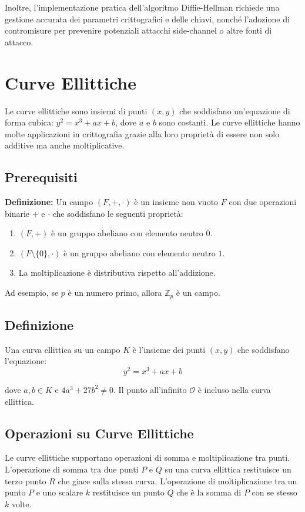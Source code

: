 \documentclass[a4paper,12pt]{report}
\begin{document}
Inoltre, l'implementazione pratica dell'algoritmo Diffie-Hellman richiede una gestione accurata dei parametri crittografici e delle chiavi, nonché l'adozione di contromisure per prevenire potenziali attacchi side-channel o altre fonti di attacco.
%
%
%
%
%
%
\chapter{Curve Ellittiche}
Le curve ellittiche sono insiemi di punti $(x, y)$ che soddisfano un'equazione di forma cubica: $y^2 = x^3 + ax + b$, dove $a$ e $b$ sono costanti. Le curve ellittiche hanno molte applicazioni in crittografia grazie alla loro proprietà di essere non solo additive ma anche moltiplicative.

\section{Prerequisiti}
\textbf{Definizione:} Un campo \( (F, +, \cdot) \) è un insieme non vuoto \( F \) con due operazioni binarie \( + \) e \( \cdot \) che soddisfano le seguenti proprietà:
\begin{enumerate}
    \item \( (F, +) \) è un gruppo abeliano con elemento neutro \( 0 \).
    \item \( (F \setminus \{0\}, \cdot) \) è un gruppo abeliano con elemento neutro \( 1 \).
    \item La moltiplicazione è distributiva rispetto all'addizione.
\end{enumerate}

Ad esempio, se \( p \) è un numero primo, allora \( \mathbb{Z}_p\) è un campo.

\section{Definizione}
Una curva ellittica su un campo $K$ è l'insieme dei punti $(x, y)$ che soddisfano l'equazione:
\[y^2 = x^3 + ax + b\]

dove $a, b \in K$ e $4a^3 + 27b^2 \neq 0$. Il punto all'infinito $\mathcal{O}$ è incluso nella curva ellittica.

\section{Operazioni su Curve Ellittiche}
Le curve ellittiche supportano operazioni di somma e moltiplicazione tra punti. L'operazione di somma tra due punti $P$ e $Q$ su una curva ellittica restituisce un terzo punto $R$ che giace sulla stessa curva. L'operazione di moltiplicazione tra un punto $P$ e uno scalare $k$ restituisce un punto $Q$ che è la somma di $P$ con se stesso $k$ volte.
\end{document}
